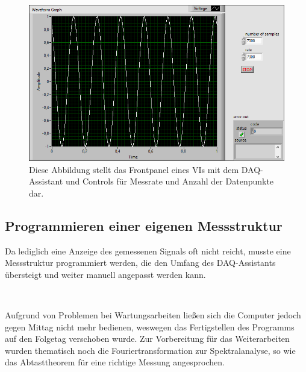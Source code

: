 \begin{figure}[ht]
	\centering
	\includegraphics[width=\textwidth]{pic/daq_sig.png}
	\caption{Diese Abbildung stellt das Frontpanel eines VIs mit dem DAQ-Assistant und Controls für Messrate und Anzahl der Datenpunkte dar.}
	\label{fig:daq_sig}	
\end{figure}



\subsection{Programmieren einer eigenen Messstruktur}

Da lediglich eine Anzeige des gemessenen Signals oft nicht reicht, musste eine Messstruktur programmiert werden, die den Umfang des DAQ-Assistants übersteigt und weiter manuell angepasst werden kann.
	
\

Aufgrund von Problemen bei Wartungsarbeiten ließen sich die Computer jedoch gegen Mittag nicht mehr bedienen, weswegen das Fertigstellen des Programms auf den Folgetag verschoben wurde. 
Zur Vorbereitung für das Weiterarbeiten wurden thematisch noch die Fouriertransformation zur Spektralanalyse, so wie das Abtasttheorem für eine richtige Messung angesprochen.
	
\

